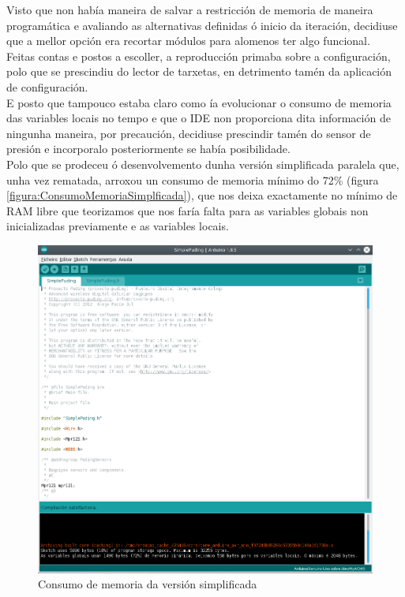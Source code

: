    Visto que non había maneira de salvar a restricción de memoria de maneira
   programática e avaliando as alternativas definidas ó inicio da iteración,
   decidiuse que a mellor opción era recortar módulos para alomenos ter algo
   funcional. \\
   
   Feitas contas e postos a escoller, a reproducción primaba sobre a
   configuración, polo que se prescindiu do lector de tarxetas, en detrimento
   tamén da aplicación de configuración. \\
   
   E posto que tampouco estaba claro como ía evolucionar o consumo de memoria
   das variables locais no tempo e que o IDE non proporciona dita información
   de ningunha maneira, por precaución, decidiuse prescindir tamén do sensor de
   presión e incorporalo posteriormente se había posibilidade. \\
   
   Polo que se prodeceu ó desenvolvemento dunha versión simplificada paralela
   que, unha vez rematada, arroxou un consumo de memoria mínimo do 72\% (figura
   \ref{figura:ConsumoMemoriaSimplficada}), que nos deixa exactamente no mínimo
   de RAM libre que teorizamos que nos faría falta para as variables globais
   non inicializadas previamente e as variables locais. \\
   
   \begin{figure}[htbp]
    \centering
    \includegraphics[scale=0.55,keepaspectratio=true]{./imagenes/consumo-memoria-simplificada.png}
    \caption{Consumo de memoria da versión simplificada}
    \label{figura:ConsumoMemoriaSimplificada}
   \end{figure}
   
